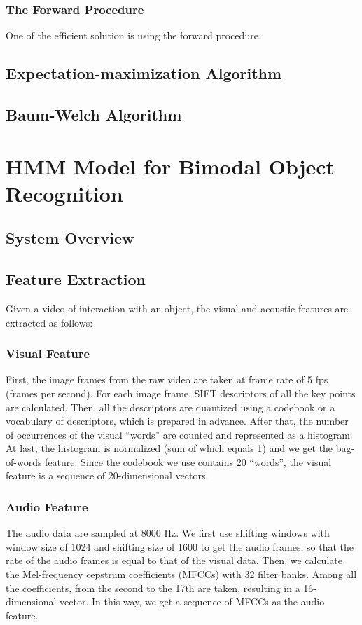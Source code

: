 \documentclass[12pt,final,twoside]{report}
\theoremstyle{plain}
\theoremstyle{definition}
\theoremstyle{remark}
\begin{document}
\subsection{The Forward Procedure}
One of the efficient solution is using the forward procedure.

\section{Expectation-maximization Algorithm}

\section{Baum-Welch Algorithm}

\cleardoublepage
\chapter{HMM Model for Bimodal Object Recognition}
\section{System Overview}

\section{Feature Extraction}
Given a video of interaction with an object, the visual and acoustic features are extracted as follows:
\subsection{Visual Feature}
First, the image frames from the raw video are taken at frame rate of 5 fps (frames per second). For each image frame, SIFT descriptors of all the key points are calculated. Then, all the descriptors are quantized using a codebook or a vocabulary of descriptors, which is prepared in advance. After that, the number of occurrences of the visual ``words'' are counted and represented as a histogram. At last, the histogram is normalized (sum of which equals 1) and we get the bag-of-words feature. Since the codebook we use contains 20 ``words'', the visual feature is a sequence of 20-dimensional vectors.
 
\subsection{Audio Feature}
The audio data are sampled at 8000 Hz. We first use shifting windows with window size of 1024 and shifting size of 1600 to get the audio frames, so that the rate of the audio frames is equal to that of the visual data. Then, we calculate the Mel-frequency cepstrum coefficients (MFCCs) with 32 filter banks. Among all the coefficients, from the second to the 17th are taken, resulting in a 16-dimensional vector. In this way, we get a sequence of MFCCs as the audio feature.
 
\end{document}
